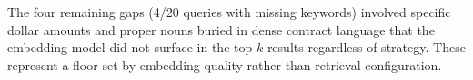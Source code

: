 \documentclass{article}
\begin{document}
The four remaining gaps (4/20 queries with missing keywords) involved specific dollar amounts and proper nouns buried in dense contract language that the embedding model did not surface in the top-$k$ results regardless of strategy. These represent a floor set by embedding quality rather than retrieval configuration.
\end{document}
